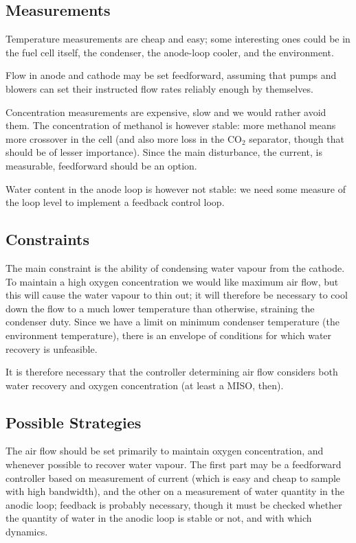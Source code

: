 \documentclass[a4paper,10pt]{article}
\newcommand{\COO}{\ensuremath{\mathrm{CO_2}}}
\begin{document}
\subsection{Measurements}
Temperature measurements are cheap and easy; some interesting ones could be in
the fuel cell itself, the condenser, the anode-loop cooler, and the environment.

Flow in anode and cathode may be set feedforward, assuming that pumps and
blowers can set their instructed flow rates reliably enough by themselves.

Concentration measurements are expensive, slow and we would rather avoid them.
The concentration of methanol is however stable: more methanol means more
crossover in the cell (and also more loss in the \COO{} separator, though that
should be of lesser importance). Since the main disturbance, the current, is
measurable, feedforward should be an option.

Water content in the anode loop is however not stable: we need some measure of
the loop level to implement a feedback control loop.

\subsection{Constraints}
The main constraint is the ability of condensing water vapour from the cathode.
To maintain a high oxygen concentration we would like maximum air flow, but this
will cause the water vapour to thin out; it will therefore be necessary to cool
down the flow to a much lower temperature than otherwise, straining the
condenser duty. Since we have a limit on minimum condenser temperature (the
environment temperature), there is an envelope of conditions for which water
recovery is unfeasible.

It is therefore necessary that the controller determining air flow considers
both water recovery and oxygen concentration (at least a MISO, then).

\subsection{Possible Strategies}
The air flow should be set primarily to maintain oxygen concentration, and
whenever possible to recover water vapour. The first part may be a feedforward
controller based on measurement of current (which is easy and cheap to sample
with high bandwidth), and the other on a measurement of water quantity in the
anodic loop; feedback is probably necessary, though it must be checked whether
the quantity of water in the anodic loop is stable or not, and with which
dynamics.
\end{document}
